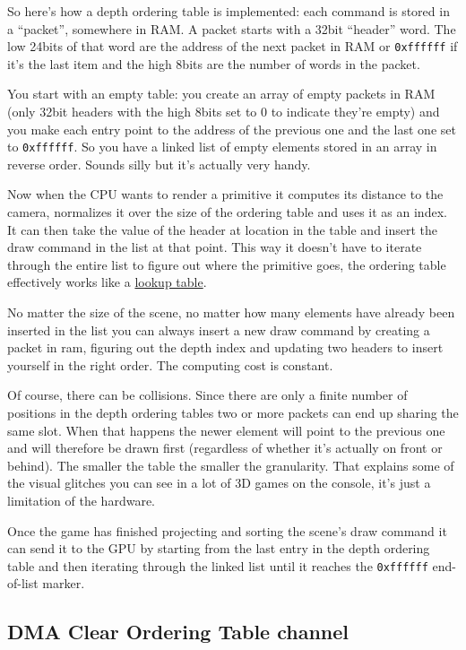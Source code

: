 \documentclass[a4paper]{article}
\newcommand{\code}[1] {\texttt{#1}}
\begin{document}
So here's how a depth ordering table is implemented: each command is
stored in a ``packet'', somewhere in RAM. A packet starts with a 32bit
``header'' word. The low 24bits of that word are the address of the
next packet in RAM or \code{0xffffff} if it's the last item and the
high 8bits are the number of words in the packet.

You start with an empty table: you create an array of empty packets in
RAM (only 32bit headers with the high 8bits set to 0 to indicate
they're empty) and you make each entry point to the address of the
previous one and the last one set to \code{0xffffff}. So you have a
linked list of empty elements stored in an array in reverse
order. Sounds silly but it's actually very handy.

Now when the CPU wants to render a primitive it computes its distance
to the camera, normalizes it over the size of the ordering table and
uses it as an index. It can then take the value of the header at
location in the table and insert the draw command in the list at that
point. This way it doesn't have to iterate through the entire list to
figure out where the primitive goes, the ordering table effectively
works like a \href{https://en.wikipedia.org/wiki/Lookup_table}{lookup
  table}.

No matter the size of the scene, no matter how many elements have
already been inserted in the list you can always insert a new draw
command by creating a packet in ram, figuring out the depth index and
updating two headers to insert yourself in the right order. The
computing cost is constant.

Of course, there can be collisions. Since there are only a finite
number of positions in the depth ordering tables two or more packets
can end up sharing the same slot. When that happens the newer element
will point to the previous one and will therefore be drawn first
(regardless of whether it's actually on front or behind). The smaller
the table the smaller the granularity. That explains some of the
visual glitches you can see in a lot of 3D games on the console, it's
just a limitation of the hardware.

Once the game has finished projecting and sorting the scene's draw
command it can send it to the GPU by starting from the last entry in
the depth ordering table and then iterating through the linked list
until it reaches the \code{0xffffff} end-of-list marker.

\subsection{DMA Clear Ordering Table channel}
\end{document}
